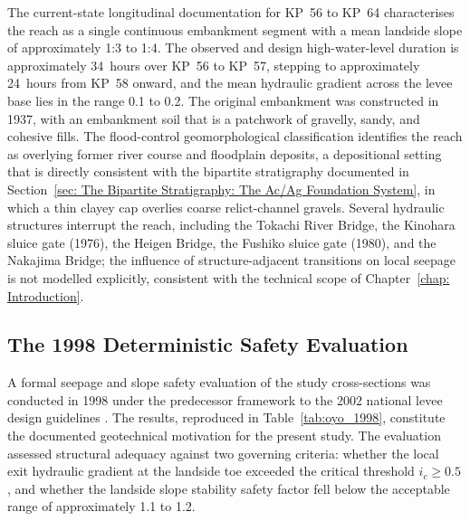The current-state longitudinal documentation for KP~56 to KP~64 \parencite{fukuda_2025_internal} characterises the reach as a single continuous embankment segment with a mean landside slope of approximately 1:3 to 1:4. The observed and design high-water-level duration is approximately 34~hours over KP~56 to KP~57, stepping to approximately 24~hours from KP~58 onward, and the mean hydraulic gradient across the levee base lies in the range 0.1 to 0.2. The original embankment was constructed in 1937, with an embankment soil that is a patchwork of gravelly, sandy, and cohesive fills. The flood-control geomorphological classification identifies the reach as overlying former river course and floodplain deposits, a depositional setting that is directly consistent with the bipartite stratigraphy documented in Section~\ref{sec: The Bipartite Stratigraphy: The Ac/Ag Foundation System}, in which a thin clayey cap overlies coarse relict-channel gravels. Several hydraulic structures interrupt the reach, including the Tokachi River Bridge, the Kinohara sluice gate (1976), the Heigen Bridge, the Fushiko sluice gate (1980), and the Nakajima Bridge; the influence of structure-adjacent transitions on local seepage is not modelled explicitly, consistent with the technical scope of Chapter~\ref{chap: Introduction}.

\subsection{The 1998 Deterministic Safety Evaluation}
\label{subsec: The 1998 Deterministic Safety Evaluation}

A formal seepage and slope safety evaluation of the study cross-sections was conducted in 1998 under the predecessor framework to the 2002 national levee design guidelines \parencite{oyo_1999}. The results, reproduced in Table~\ref{tab:oyo_1998}, constitute the documented geotechnical motivation for the present study. The evaluation assessed structural adequacy against two governing criteria: whether the local exit hydraulic gradient at the landside toe exceeded the critical threshold $i_c \geq 0.5$, and whether the landside slope stability safety factor fell below the acceptable range of approximately 1.1 to 1.2.

